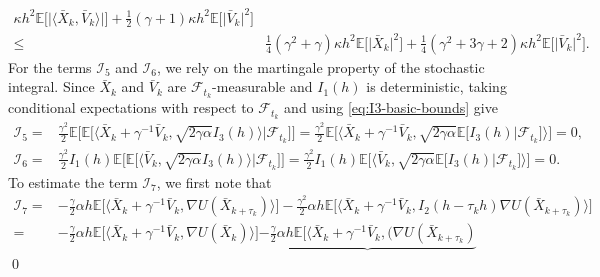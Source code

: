 \documentclass[12pt]{article}
\numberwithin{equation}{section}
\renewenvironment{proof}%
  {\begin{trivlist}%
   \item[]\ignorespaces}%
  {\qed\end{trivlist}}
\newcommand{\E}{\mathbb{E}}
\newcommand{\X}{\bar{X}}
\newcommand{\V}{\bar{V}}
\begin{document}
\begin{proof}
\begin{equation}
\begin{aligned}
\kappa
h^{2}
\E
\Big[
\Big|\big\langle
\X_k
,
\V_k
\big\rangle\Big|
\Big]
+
\tfrac{1}{2}
(\gamma+1)
\kappa
h^{2}
\E
\Big[
\big|
\V_k
\big|^2
\Big]
\\
\leq &
\tfrac{1}{4}
(\gamma^2+\gamma)
\kappa
h^{2}
\E
\Big[
\big|
\X_k
\big|^2
\Big]
+
\tfrac{1}{4}
(\gamma^2+3\gamma + 2)
\kappa
h^{2}
\E
\Big[
\big|
\V_k
\big|^2
\Big].
\end{aligned}
\end{equation}
For the terms $\mathcal I_5$ and $\mathcal I_6$, we rely on the martingale property of the stochastic integral. Since $\bar X_k$ and $\bar V_k$ are $\mathcal F_{t_k}$-measurable and $I_1(h)$ is deterministic, taking conditional expectations with respect to $\mathcal F_{t_k}$ and using \eqref{eq:I3-basic-bounds} give
\begin{equation}
\begin{aligned}
\mathcal I_5  
=   &
\tfrac{\gamma^2}{2}
\mathbb{E}
\Big[
\E
\Big[
\Big\langle
\bar{X}_k
+
\gamma^{-1}\bar{V}_k,
\sqrt{2\gamma\alpha}
I_3(h)
\Big\rangle
\Big| 
\mathcal F_{t_k}
\Big]
\Big]
=
\tfrac{\gamma^2}{2}
\mathbb{E}
\Big[
\Big\langle
\bar{X}_k
+
\gamma^{-1}\bar{V}_k,
\sqrt{2\gamma\alpha}
\E
\big[
I_3(h)
\big| 
\mathcal F_{t_k}
\big]
\Big\rangle
\Big]
=
0,
\\ 
\mathcal I_6  
=   &
\tfrac{\gamma^2}{2}
I_1(h)
\mathbb{E}
\Big[
\E
\Big[
\big\langle
\bar{V}_k,
\sqrt{2\gamma\alpha}
I_3(h)
\big\rangle
\Big| 
\mathcal F_{t_k}
\Big]
\Big]
=
\tfrac{\gamma^2}{2}
I_1(h)
\mathbb{E}
\Big[
\Big\langle
\bar{V}_k,
\sqrt{2\gamma\alpha}
\E
\big[
I_3(h)
\big| 
\mathcal F_{t_k}
\big]
\Big\rangle
\Big]
=0.
\end{aligned}
\end{equation}
To estimate the term $\mathcal I_7$, we first note that
\begin{equation}
\label{eq:mathcal-I-7}
\begin{aligned}
\mathcal I_7 
=   &
-
\tfrac{\gamma}{2}
\alpha  h
\mathbb{E}
\Big[
\Big\langle
\bar{X}_k
+
\gamma^{-1}\bar{V}_k,
\nabla U(\bar{X}_{k+\tau_k})
\Big\rangle
\Big]
-
\tfrac{\gamma^2}{2}
\alpha  h
\mathbb{E}
\Big[
\Big\langle
\bar{X}_k
+
\gamma^{-1}\bar{V}_k,
I_{2} (h-\tau_kh)
\nabla U(\bar{X}_{k+\tau_k})
\Big\rangle
\Big]
\\ 
=   &
-
\tfrac{\gamma}{2}
\alpha  h
\mathbb{E}
\Big[
\Big\langle
\bar{X}_k
+
\gamma^{-1}\bar{V}_k,
\nabla U(\bar{X}_{k})
\Big\rangle
\Big]
\underbrace{
-
\tfrac{\gamma}{2}
\alpha  h
\mathbb{E}
\Big[
\Big\langle
\bar{X}_k
+
\gamma^{-1}\bar{V}_k,
\big(
\nabla U(\bar{X}_{k+\tau_k})
}
\end{aligned}
\end{equation}
\end{proof}
\end{document}
